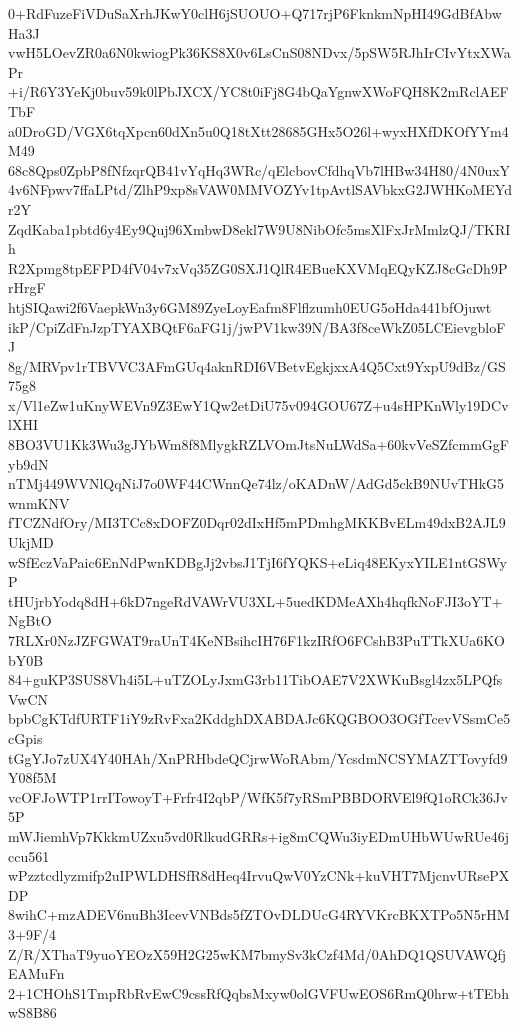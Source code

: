0+RdFuzeFiVDuSaXrhJKwY0clH6jSUOUO+Q717rjP6FknkmNpHI49GdBfAbwHa3J
vwH5LOevZR0a6N0kwiogPk36KS8X0v6LsCnS08NDvx/5pSW5RJhIrCIvYtxXWaPr
+i/R6Y3YeKj0buv59k0lPbJXCX/YC8t0iFj8G4bQaYgnwXWoFQH8K2mRclAEFTbF
a0DroGD/VGX6tqXpcn60dXn5u0Q18tXtt28685GHx5O26l+wyxHXfDKOfYYm4M49
68c8Qps0ZpbP8fNfzqrQB41vYqHq3WRc/qElcbovCfdhqVb7lHBw34H80/4N0uxY
4v6NFpwv7ffaLPtd/ZlhP9xp8sVAW0MMVOZYv1tpAvtlSAVbkxG2JWHKoMEYdr2Y
ZqdKaba1pbtd6y4Ey9Quj96XmbwD8ekl7W9U8NibOfc5msXlFxJrMmlzQJ/TKRIh
R2Xpmg8tpEFPD4fV04v7xVq35ZG0SXJ1QlR4EBueKXVMqEQyKZJ8cGcDh9PrHrgF
htjSIQawi2f6VaepkWn3y6GM89ZyeLoyEafm8Flflzumh0EUG5oHda441bfOjuwt
ikP/CpiZdFnJzpTYAXBQtF6aFG1j/jwPV1kw39N/BA3f8ceWkZ05LCEievgbloFJ
8g/MRVpv1rTBVVC3AFmGUq4aknRDI6VBetvEgkjxxA4Q5Cxt9YxpU9dBz/GS75g8
x/Vl1eZw1uKnyWEVn9Z3EwY1Qw2etDiU75v094GOU67Z+u4sHPKnWly19DCvlXHI
8BO3VU1Kk3Wu3gJYbWm8f8MlygkRZLVOmJtsNuLWdSa+60kvVeSZfcmmGgFyb9dN
nTMj449WVNlQqNiJ7o0WF44CWnnQe74lz/oKADnW/AdGd5ckB9NUvTHkG5wnmKNV
fTCZNdfOry/MI3TCc8xDOFZ0Dqr02dIxHf5mPDmhgMKKBvELm49dxB2AJL9UkjMD
wSfEczVaPaic6EnNdPwnKDBgJj2vbsJ1TjI6fYQKS+eLiq48EKyxYILE1ntGSWyP
tHUjrbYodq8dH+6kD7ngeRdVAWrVU3XL+5uedKDMeAXh4hqfkNoFJI3oYT+NgBtO
7RLXr0NzJZFGWAT9raUnT4KeNBsihcIH76F1kzIRfO6FCshB3PuTTkXUa6KObY0B
84+guKP3SUS8Vh4i5L+uTZOLyJxmG3rb11TibOAE7V2XWKuBsgl4zx5LPQfsVwCN
bpbCgKTdfURTF1iY9zRvFxa2KddghDXABDAJc6KQGBOO3OGfTcevVSsmCe5cGpis
tGgYJo7zUX4Y40HAh/XnPRHbdeQCjrwWoRAbm/YcsdmNCSYMAZTTovyfd9Y08f5M
vcOFJoWTP1rrITowoyT+Frfr4I2qbP/WfK5f7yRSmPBBDORVEl9fQ1oRCk36Jv5P
mWJiemhVp7KkkmUZxu5vd0RlkudGRRs+ig8mCQWu3iyEDmUHbWUwRUe46jccu561
wPzztcdlyzmifp2uIPWLDHSfR8dHeq4IrvuQwV0YzCNk+kuVHT7MjcnvURsePXDP
8wihC+mzADEV6nuBh3IcevVNBds5fZTOvDLDUcG4RYVKrcBKXTPo5N5rHM3+9F/4
Z/R/XThaT9yuoYEOzX59H2G25wKM7bmySv3kCzf4Md/0AhDQ1QSUVAWQfjEAMuFn
2+1CHOhS1TmpRbRvEwC9cssRfQqbsMxyw0olGVFUwEOS6RmQ0hrw+tTEbhwS8B86
